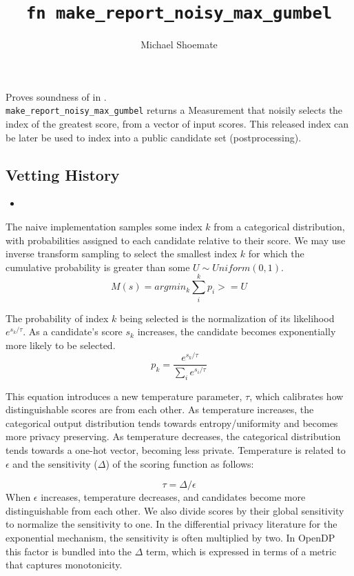 \documentclass{article}
\title{\texttt{fn make\_report\_noisy\_max\_gumbel}}
\author{Michael Shoemate}
\begin{document}
 
\maketitle

\contrib

Proves soundness of  
in .\\
\texttt{make\_report\_noisy\_max\_gumbel} returns a Measurement that 
noisily selects the index of the greatest score, from a vector of input scores.
This released index can be later be used to index into a public candidate set (postprocessing).

\subsection*{Vetting History}
\begin{itemize}
    \item {}
\end{itemize}

The naive implementation samples some index $k$ from a categorical distribution, 
with probabilities assigned to each candidate relative to their score.
We may use inverse transform sampling to select the smallest index $k$ for which the cumulative probability is greater than some $U \sim Uniform(0, 1)$.
\begin{equation} 
    \label{m-naive} 
    M(s) = argmin_k \sum_i^k p_i >= U
\end{equation} 

The probability of index $k$ being selected is the normalization of its likelihood $e^{s_k / \tau}$.
As a candidate's score $s_k$ increases, the candidate becomes exponentially more likely to be selected.
\begin{equation}
    \label{prob-of-k}
    p_k = \frac{e^{s_k / \tau}}{\sum_i e^{s_i / \tau}}
\end{equation}

This equation introduces a new temperature parameter, $\tau$, which calibrates how distinguishable scores are from each other.
As temperature increases, the categorical output distribution tends towards entropy/uniformity and becomes more privacy preserving.
As temperature decreases, the categorical distribution tends towards a one-hot vector, becoming less private.
Temperature is related to $\epsilon$ and the sensitivity ($\Delta$) of the scoring function as follows:

\begin{equation}
    \tau = \Delta / \epsilon
\end{equation}
When $\epsilon$ increases, temperature decreases, and candidates become more distinguishable from each other.
We also divide scores by their global sensitivity to normalize the sensitivity to one.
In the differential privacy literature for the exponential mechanism, the sensitivity is often multiplied by two.
In OpenDP this factor is bundled into the $\Delta$ term, which is expressed in terms of a metric that captures monotonicity.
\end{document}
